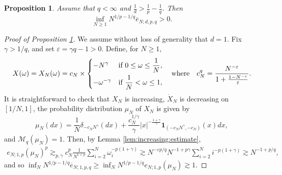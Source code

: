 \documentclass[10pt,a4paper]{amsart}
\newtheorem{proposition}{Proposition}
\newcommand{\eps}{\varepsilon}
\newcommand{\ind}{\mathbf{1}}
\newcommand{\mcl}{\mathcal}
\newcommand{\oline}[1]{\overline{#1}}
\begin{document}
\begin{proposition}\label{prop:uniform_optimal}
	Assume that $q < \infty$ and $\frac{1}{d} > \frac{1}{p} - \frac{1}{q}$. Then
	\[
		\inf_{N \ge 1} N^{1/p - 1/q}\oline e_{N;d,p,q} > 0.
	\]
\end{proposition}

\begin{proof}[Proof of Proposition \ref{prop:uniform_optimal}]
	We assume without loss of generality that $d = 1$. Fix $\gamma > 1/q$, and set $\eps = \gamma q  - 1 > 0$. Define, for $N \ge 1$,
\[
	X(\omega) = X_N(\omega) = c_N \times
	\begin{dcases}
		- N^\gamma & \text{if } 0 \le \omega \le \frac{1}{N}, \\
		- \omega^{-\gamma} & \text{if } \frac{1}{N} < \omega \le 1,
	\end{dcases}
	\quad \text{where} \quad
	c_N^q =  \frac{ N^{-\eps} }{1 + \frac{1 - N^{-\eps}}{\eps} }.
\]
It is straightforward to check that $X_N$ is increasing, $\dot X_N$ is decreasing on $[1/N, 1]$, the probability distribution $\mu_N$ of $X_N$ is given by
\[
	\mu_N(dx) = \frac{1}{N} \delta_{-c_N N^\gamma}(dx) + \frac{c_N^{1/\gamma}}{\gamma} |x|^{- \frac{1+\gamma}{\gamma}} \ind_{(-c_N N^\gamma, -c_N)}(x) dx,
\]
and $\mcl M_q(\mu_N) = 1$. Then, by Lemma \ref{lem:increasing:estimate},
\begin{align*}
	e_{N;1,p}(\mu_N)^p \gtrsim_{p,\gamma} c_N^p \frac{1}{N^{1+p}} \sum_{i=2}^N \omega_i^{-p(1+\gamma)}
	\gtrsim N^{-\eps p/q} N^{-1 + p \gamma} \sum_{i=2}^N i^{-p(1+\gamma)} \gtrsim N^{-1 + p/q},
\end{align*}
and so $\inf_N N^{1/p - 1/q} \oline e_{N;1,p,q} \ge \inf_N N^{1/p - 1/q} e_{N;1,p}(\mu_N) \gtrsim 1$.
\end{proof}
\end{document}
